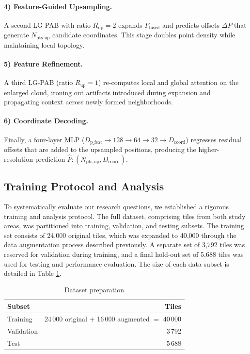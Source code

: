\documentclass[preprints,article,accept,pdftex,moreauthors]{Definitions/mdpi}
\begin{document}
\paragraph{4) Feature-Guided Upsampling.}
A second LG-PAB with ratio $R_{\text{up}}=2$ expands $F_{\text{fused}}$ and predicts offsets $\Delta P$ that generate $N_{\text{pts\_up}}$ candidate coordinates. This stage doubles point density while maintaining local topology.

\paragraph{5) Feature Refinement.}
A third LG-PAB (ratio $R_{\text{up}}=1$) re-computes local and global attention on the enlarged cloud, ironing out artifacts introduced during expansion and propagating context across newly formed neighborhoods.

\paragraph{6) Coordinate Decoding.}
Finally, a four-layer MLP ($D_{\text{p\_feat}} \rightarrow 128 \rightarrow 64 \rightarrow 32 \rightarrow D_{\text{coord}}$) regresses residual offsets that are added to the upsampled positions, producing the higher-resolution prediction $\hat{P}: (N_{\text{pts\_up}}, D_{\text{coord}})$.

\subsection{Training Protocol and Analysis}
\label{sec:study_design}
To systematically evaluate our research questions, we established a rigorous training and analysis protocol. The full dataset, comprising tiles from both study areas, was partitioned into training, validation, and testing subsets. The training set consists of 24,000 original tiles, which was expanded to 40,000 through the data augmentation process described previously. A separate set of 3,792 tiles was reserved for validation during training, and a final hold-out set of 5,688 tiles was used for testing and performance evaluation. The size of each data subset is detailed in Table \ref{tab:data_prep}.
\begin{table}[htbp]
  \centering
  \caption{Dataset preparation}
  \label{tab:data_prep}
  \begin{tabular}{lr}
    \toprule
    \textbf{Subset} & \textbf{Tiles} \\
    \midrule
    Training        & 24\,000 original $+$ 16\,000 augmented $=$ 40\,000 \\
    Validation      & 3\,792 \\
    Test            & 5\,688 \\
    \bottomrule
  \end{tabular}
\end{table}
\end{document}

